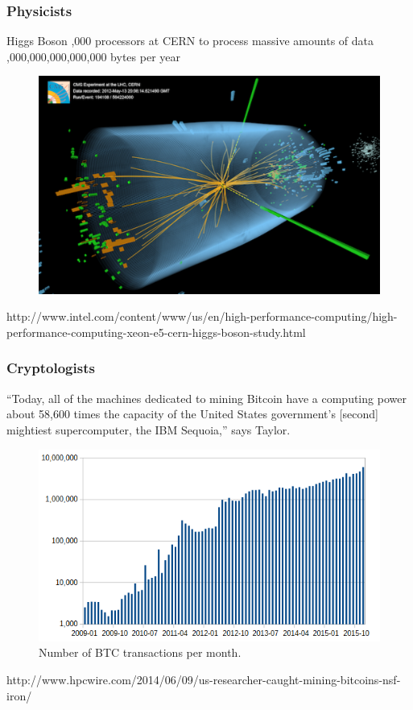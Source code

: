 \documentclass{beamer}
\begin{document}
\begin{frame}
  \frametitle{Physicists}
  \center Higgs Boson
  ,000 processors at CERN to process massive amounts of data 
  ,000,000,000,000,000 bytes per year
   \begin{figure} \centering 
     \includegraphics[width=.7\textwidth]{figs/phys/Candidate_Higgs_Events_in_ATLAS_and_CMS_cropped.png}
   \end{figure}
   {\small http://www.intel.com/content/www/us/en/high-performance-computing/high-performance-computing-xeon-e5-cern-higgs-boson-study.html }
\end{frame}

\begin{frame}
  \frametitle{Cryptologists}
  \center ``Today, all of the machines dedicated to mining Bitcoin have a
  computing power about 58,600 times the capacity of the United States
  government’s [second] mightiest supercomputer, the IBM Sequoia,'' says
  Taylor. \\
   \begin{figure} \centering 
     \includegraphics[width=.7\textwidth]{figs/crypt/BTC_number_of_transactions_per_month.png}
     \caption{Number of BTC transactions per month.}
   \end{figure}
  {\small http://www.hpcwire.com/2014/06/09/us-researcher-caught-mining-bitcoins-nsf-iron/ }
\end{frame}
\end{document}
